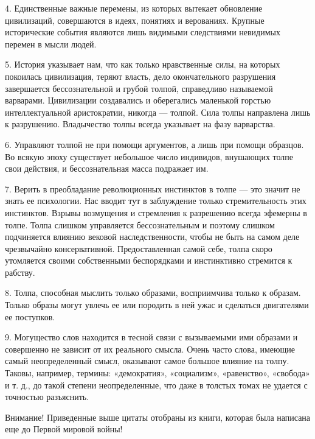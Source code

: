 4. Единственные важные перемены, из которых вытекает обновление цивилизаций,
совершаются в идеях, понятиях и верованиях. Крупные исторические события
являются лишь видимыми следствиями невидимых перемен в мысли людей.

5. История указывает нам, что как только нравственные силы, на которых
покоилась цивилизация, теряют власть, дело окончательного разрушения
завершается бессознательной и грубой толпой, справедливо называемой варварами.
Цивилизации создавались и оберегались маленькой горстью интеллектуальной
аристократии, никогда — толпой. Сила толпы направлена лишь к разрушению.
Владычество толпы всегда указывает на фазу варварства.

6. Управляют толпой не при помощи аргументов, а лишь при помощи образцов. Во
всякую эпоху существует небольшое число индивидов, внушающих толпе свои
действия, и бессознательная масса подражает им.

7. Верить в преобладание революционных инстинктов в толпе — это значит не знать
ее психологии. Нас вводит тут в заблуждение только стремительность этих
инстинктов. Взрывы возмущения и стремления к разрешению всегда эфемерны в
толпе. Толпа слишком управляется бессознательным и поэтому слишком подчиняется
влиянию вековой наследственности, чтобы не быть на самом деле чрезвычайно
консервативной. Предоставленная самой себе, толпа скоро утомляется своими
собственными беспорядками и инстинктивно стремится к рабству.

8. Толпа, способная мыслить только образами, восприимчива только к образам.
Только образы могут увлечь ее или породить в ней ужас и сделаться двигателями
ее поступков.

9. Могущество слов находится в тесной связи с вызываемыми ими образами и
совершенно не зависит от их реального смысла. Очень часто слова, имеющие самый
неопределенный смысл, оказывают самое большое влияние на толпу. Таковы,
например, термины: «демократия», «социализм», «равенство», «свобода» и т. д.,
до такой степени неопределенные, что даже в толстых томах не удается с
точностью разъяснить.

Внимание! Приведенные выше цитаты отобраны из книги, которая была написана еще
до Первой мировой войны!

